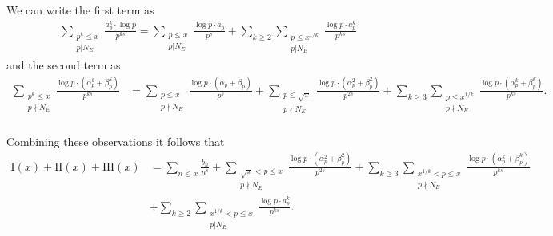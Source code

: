 \documentclass[12pt,reqno]{amsart}
\theoremstyle{definition}
\numberwithin{equation}{section}
\begin{document}
We can write the first term as
\begin{align*}
 {\sum_{\substack{p^k \leq x \\ p | N_E}}} \frac{a_p^k \cdot \log p}{p^{ks}}= {\sum_{\substack{p \leq x \\ p |  N_E}}}\frac{ \log p \cdot a_p }{p^{s}}+  \sum_{k \geq 2} {\sum_{\substack{p\leq x^{1/k} \\ p | N_E}}}\frac{ \log p \cdot a_p^k }{p^{ks}}
\end{align*}
and the second term as 
\begin{align*}
 {\sum_{\substack{p^k \leq x \\ p \nmid  N_E}}} \frac{ \log p \cdot (\alpha_p^k+\beta_p^k) }{p^{ks}} &=  {\sum_{\substack{p \leq x \\ p \nmid  N_E}}}\frac{ \log p \cdot (\alpha_p+\beta_p) }{p^{s}}+  {\sum_{\substack{p \leq \sqrt x \\ p \nmid  N_E}}}\frac{ \log p \cdot (\alpha_p^2+\beta_p^2) }{p^{2s}}+  \sum_{k \geq 3} {\sum_{\substack{p \leq x^{1/k} \\ p \nmid  N_E}}}\frac{ \log p \cdot (\alpha_p^k+\beta_p^k) }{p^{ks}}. \\
\end{align*}

Combining these observations it follows that 
\begin{align*}
\text{I}(x)+\text{II}(x)+\text{III}(x)  &= \sum_{n \leq x} \frac{b_n}{n^s}+ \sum_{\substack{\sqrt x < p \leq x \\ p \nmid  N_E}} \frac{ \log p \cdot (\alpha_p^2+\beta_p^2) }{p^{2s}}+ \sum_{k \geq 3} {\sum_{\substack{ x^{1/k}<p \leq x \\ p \nmid  N_E}}}\frac{ \log p \cdot (\alpha_p^k+\beta_p^k) }{p^{ks}} \\
&+  \sum_{k \geq 2} {\sum_{\substack{x^{1/k}<p \leq x \\ p | N_E}}}\frac{ \log p \cdot a_p^k }{p^{ks}}. 
\end{align*}
\end{document}

